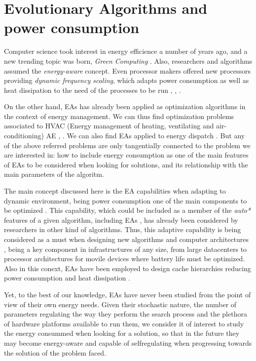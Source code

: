 \section{Evolutionary Algorithms and power consumption}

Computer science took interest in energy efficience a number of years ago, and a new trending topic was born, \textit{Green Computing} \cite{green-computing}.  Also, researchers and algorithms assumed the \textit{energy-aware} \cite{energy-aware} concept.  Even processor makers offered new processors providing \textit{dynamic frequency scaling}, which adapts power consumption as well as heat dissipation to the need of the processes to be run \cite{scaling}, \cite{dynamic-scaling}, \cite{energy-efficient}.

On the other hand, EAs has already been applied as optimization algorithms in the context of energy management.  We can thus find optimization problems associated to HVAC (Energy management of heating, ventilating and air-conditioning) AE \cite{HVAC}, \cite{chiller}.  We can also find EAs applied to energy dispatch \cite{dispatch}.  But any of the above referred problems are only tangentially connected to the problem we are interested in:  how to include energy consumption as one of the main features of EAs to be considered when looking for solutions, and its relationship with the main parameters of the algoritm.

The main concept discussed here is the EA capabilities when adapting to dynamic environment, being power consumption one of the main components to be optimized \cite{ephemeral}. This capability, which could be included as a member of the \textit{auto*} features of a given algorithm, including EAs \cite{self}, has already been considered by researchers in other kind of algorithms.  Thus, this adaptive capability is being considered as a must when designing new algorithms and computer architectures \cite{energy-aware}, being a key component in infrastructures of any size, from large datacenters to processor architectures for movile devices where battery life must be optimized.  Also in this conext, EAs have been employed to design cache hierarchies reducing power consumption and heat dissipation \cite{cache}.

Yet, to the best of our knowledge, EAs have never been studied from the point of view of their own energy needs.  %
Given their stochastic nature, the number of parameters regulating the way they perform the search process and the plethora of hardware platforms available to run them, we consider it of interest to study the energy consummed when looking for a solution, so that in the future they may become energy-aware and capable of selfregulating when progressing towards the solution of the problem faced.

